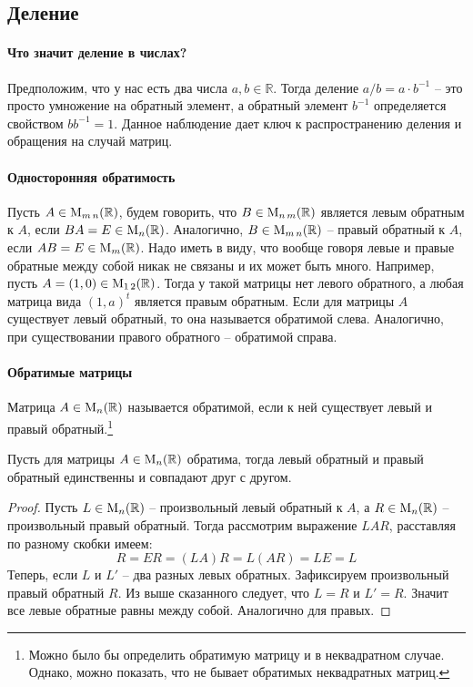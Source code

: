 \subsection{Деление}

\paragraph{Что значит деление в числах?} Предположим, что у нас есть два числа $a,b\in\mathbb R$. Тогда деление $a/b = a \cdot b^{-1}$ -- это просто умножение на обратный элемент, а обратный элемент $b^{-1}$ определяется свойством $b b^{-1} = 1$. Данное наблюдение дает ключ к распространению деления и обращения на случай матриц.

\paragraph{Односторонняя обратимость} Пусть $A\in\operatorname{M}_{m\,n}(\mathbb R)$, будем говорить, что $B\in\operatorname{M}_{n\,m}(\mathbb R)$ является левым обратным к $A$, если $BA = E\in\operatorname{M}_{n}(\mathbb R)$. Аналогично, $B\in\operatorname{M}_{m\,n}(\mathbb R)$ -- правый обратный к $A$, если $AB = E\in\operatorname{M}_{m}(\mathbb R)$. Надо иметь в виду, что вообще говоря левые и правые обратные между собой никак не связаны и их может быть много. Например, пусть $A = (1, 0)\in\operatorname{M}_{1\,2}(\mathbb R)$. Тогда у такой матрицы нет левого обратного, а любая матрица вида $(1, a)^t$ является правым обратным. Если для матрицы $A$ существует левый обратный, то она называется обратимой слева. Аналогично, при существовании правого обратного -- обратимой справа.

\paragraph{Обратимые матрицы} Матрица $A\in\operatorname{M}_{n}(\mathbb R)$ называется обратимой, если к ней существует левый и правый обратный.\footnote{Можно было бы определить обратимую матрицу и в неквадратном случае. Однако, можно показать, что не бывает обратимых неквадратных матриц.}

\begin{claim*}
Пусть для матрицы $A\in\operatorname{M}_{n}(\mathbb R)$ обратима, тогда левый обратный и правый обратный единственны и совпадают друг с другом.
\end{claim*}
\begin{proof}
Пусть $L\in\operatorname{M}_{n}(\mathbb R)$ -- произвольный левый обратный к $A$, а $R\in\operatorname{M}_{n}(\mathbb R)$ -- произвольный правый обратный. Тогда рассмотрим выражение $LAR$, расставляя по разному скобки имеем:
\[
R = ER = (LA)R = L (AR) = LE = L
\]
Теперь, если $L$ и $L'$ -- два разных левых обратных. Зафиксируем произвольный правый обратный $R$. Из выше сказанного следует, что $L = R$ и $L' = R$. Значит все левые обратные равны между собой. Аналогично для правых.
\end{proof}

